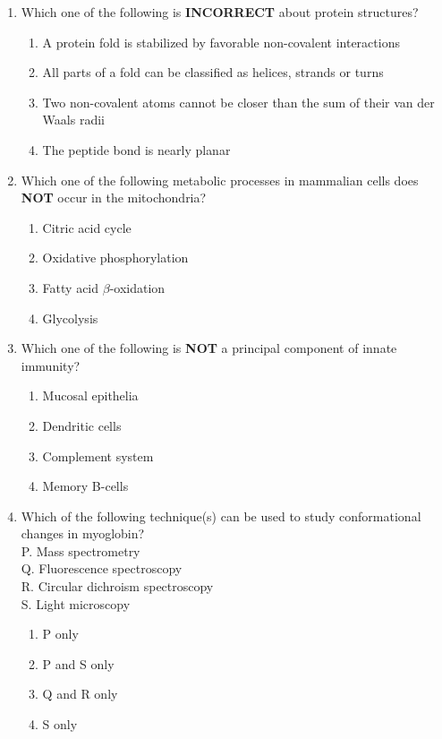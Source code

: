 \documentclass[journal,12pt,onecolumn]{IEEEtran}
\theoremstyle{remark}
\begin{document}
\begin{enumerate}
    \item Which one of the following is \textbf{INCORRECT} about protein structures?
    
    \begin{enumerate}
        \item A protein fold is stabilized by favorable non-covalent interactions
        \item All parts of a fold can be classified as helices, strands or turns
        \item Two non-covalent atoms cannot be closer than the sum of their van der Waals radii
        \item The peptide bond is nearly planar
    \end{enumerate}
    

    \item Which one of the following metabolic processes in mammalian cells does \textbf{NOT} occur in the mitochondria?
    \begin{multicols}{2}
    \begin{enumerate}
        \item Citric acid cycle
        \item Oxidative phosphorylation
        \item Fatty acid $\beta$-oxidation
        \item Glycolysis
    \end{enumerate}
    \end{multicols}
    
    \item Which one of the following is \textbf{NOT} a principal component of innate immunity?
    
    \begin{enumerate}
        \item Mucosal epithelia
        \item Dendritic cells
        \item Complement system
        \item Memory B-cells
    \end{enumerate}

    \item Which of the following technique(s) can be used to study conformational changes in myoglobin?\\
        P. Mass spectrometry\\
        Q. Fluorescence spectroscopy\\
        R. Circular dichroism spectroscopy\\
        S. Light microscopy
    \begin{multicols}{4}
    \begin{enumerate}
        \item P only
        \item P and S only
        \item Q and R only
        \item S only
    \end{enumerate}
    \end{multicols}


\end{enumerate}
\end{document}
